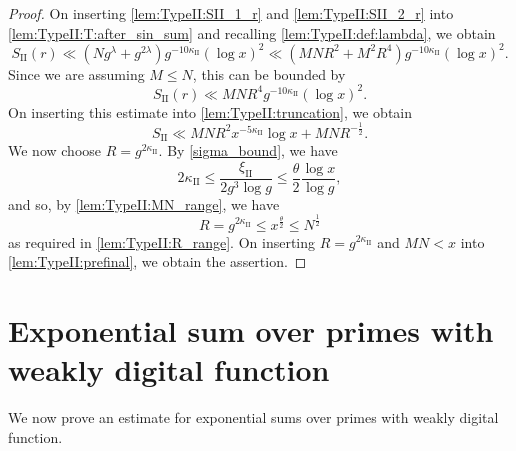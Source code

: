 \documentclass[hidelinks]{amsart}
\numberwithin{equation}{section}
\theoremstyle{plain}
\theoremstyle{definition}
\begin{document}
\begin{proof}
On inserting \cref{lem:TypeII:SII_1_r} and \cref{lem:TypeII:SII_2_r}
into \cref{lem:TypeII:T:after_sin_sum}
and recalling \cref{lem:TypeII:def:lambda}, we obtain
\[
S_{\mathrm{II}}(r)
\ll
(Ng^{\lambda}+g^{2\lambda})g^{-10\kappa_{\mathrm{II}}}(\log x)^{2}
\ll
(MNR^{2}+M^{2}R^{4})g^{-10\kappa_{\mathrm{II}}}(\log x)^{2}.
\]
Since we are assuming $M\le N$, this can be bounded by
\[
S_{\mathrm{II}}(r)
\ll
MNR^{4}g^{-10\kappa_{\mathrm{II}}}(\log x)^{2}.
\]
On inserting this estimate into \cref{lem:TypeII:truncation}, we obtain
\begin{equation}
\label{lem:TypeII:prefinal}
S_{\mathrm{II}}
\ll
MNR^{2}x^{-5\kappa_{\mathrm{II}}}\log x
+
MNR^{-\frac{1}{2}}.
\end{equation}
We now choose $R=g^{2\kappa_{\mathrm{II}}}$.
By \cref{sigma_bound}, we have
\[
2\kappa_{\mathrm{II}}
\le
\frac{\xi_{\mathrm{II}}}{2g^{3}\log g}
\le
\frac{\theta}{2}\frac{\log x}{\log g},
\]
and so, by \cref{lem:TypeII:MN_range}, we have
\[
R=g^{2\kappa_{\mathrm{II}}}\le x^{\frac{\theta}{2}}\le N^{\frac{1}{2}}
\]
as required in \cref{lem:TypeII:R_range}.
On inserting $R=g^{2\kappa_{\mathrm{II}}}$ and $MN<x$ into \cref{lem:TypeII:prefinal}, we obtain the assertion.
\end{proof}

\section{Exponential sum over primes with weakly digital function}
\label{sec:exp_sum_over_prime_wdf}
We now prove an estimate for exponential sums over primes with weakly digital function.
\end{document}
